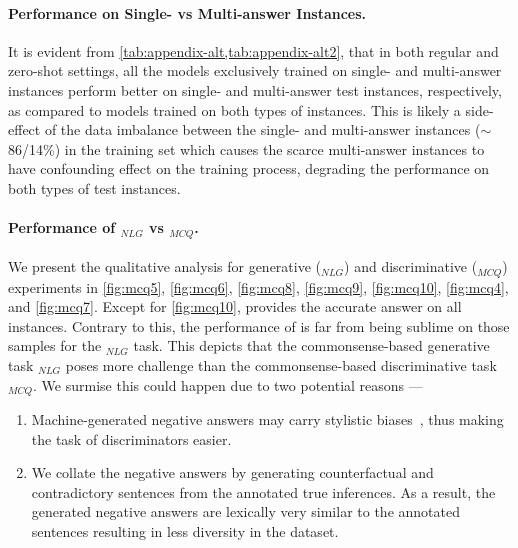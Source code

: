 \paragraph{Performance on Single- vs Multi-answer Instances.} It is evident from \cref{tab:appendix-alt,tab:appendix-alt2}, that in both regular and zero-shot settings, all the models exclusively trained on single- and multi-answer instances perform better on single- and multi-answer test instances, respectively, as compared to models trained on both types of instances. This is likely a side-effect of the data imbalance between the single- and multi-answer instances ($\sim$86/14\%) in the training set which causes the scarce multi-answer instances to have confounding effect on the training process, degrading the performance on both types of test instances.

\paragraph{Performance of \dataset{}$_{NLG}$ vs \dataset{}$_{MCQ}$.}
We present the qualitative analysis for generative (\dataset{}$_{NLG}$) and discriminative (\dataset{}$_{MCQ}$) experiments in \cref{fig:mcq5}, \cref{fig:mcq6}, \cref{fig:mcq8}, \cref{fig:mcq9}, \cref{fig:mcq10}, \cref{fig:mcq4}, and \cref{fig:mcq7}. Except for \cref{fig:mcq10},  provides the accurate answer on all instances. Contrary to this, the performance of  is far from being sublime on those samples for the \dataset{}$_{NLG}$ task. This depicts that the commonsense-based generative task \dataset{}$_{NLG}$ poses more challenge than the commonsense-based discriminative task \dataset{}$_{MCQ}$. We surmise this could happen due to two potential reasons --- 
\begin{enumerate}
    \item Machine-generated negative answers may carry stylistic biases~\cite{zellers2018swag}, thus making the task of discriminators easier.
    \item We collate the negative answers by generating counterfactual and contradictory sentences from the annotated true inferences. As a result, the generated negative answers are lexically very similar to the annotated sentences resulting in less diversity in the dataset. 
\end{enumerate}

